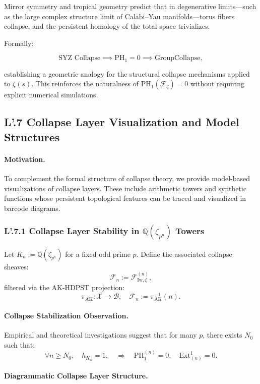 \documentclass[11pt]{article}
\begin{document}
Mirror symmetry and tropical geometry predict that in degenerative limits—such as the large complex structure limit of Calabi–Yau manifolds—torus fibers collapse, and the persistent homology of the total space trivializes.

Formally:

\[
\text{SYZ Collapse} \implies \mathrm{PH}_1 = 0 \implies \mathrm{GroupCollapse},
\]

establishing a geometric analogy for the structural collapse mechanisms applied to $\zeta(s)$. This reinforces the naturalness of $\mathrm{PH}_1(\mathcal{F}_{\zeta}) = 0$ without requiring explicit numerical simulations.

\subsection*{L'.7 Collapse Layer Visualization and Model Structures}

\paragraph{Motivation.}
To complement the formal structure of collapse theory, we provide model-based visualizations of collapse layers. These include arithmetic towers and synthetic functions whose persistent topological features can be traced and visualized in barcode diagrams.

\subsubsection*{L'.7.1 Collapse Layer Stability in $\mathbb{Q}(\zeta_{p^n})$ Towers}

Let $K_n := \mathbb{Q}(\zeta_{p^n})$ for a fixed odd prime $p$. Define the associated collapse sheaves:
\[
\mathcal{F}_n := \mathcal{F}_{\mathrm{Iw}, \zeta}^{(n)},
\]
filtered via the AK-HDPST projection:
\[
\pi_{\mathrm{AK}} : \mathcal{X} \to \mathcal{B}, \quad \mathcal{F}_n := \pi_{\mathrm{AK}}^{-1}(n).
\]

\paragraph{Collapse Stabilization Observation.}
Empirical and theoretical investigations suggest that for many $p$, there exists $N_0$ such that:
\[
\forall n \geq N_0, \quad h_{K_n} = 1, \quad \Rightarrow \quad \mathrm{PH}_1^{(n)} = 0, \quad \mathrm{Ext}^1_{(n)} = 0.
\]

\paragraph{Diagrammatic Collapse Layer Structure.}
\end{document}
